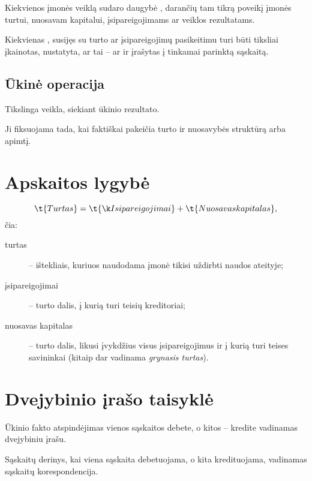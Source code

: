 
Kiekvienos įmonės veiklą sudaro daugybė , darančių
tam tikrą poveikį įmonės turtui, nuosavam kapitalui, įsipareigojimams
ar veiklos rezultatams.

Kiekvienas , susijęs su turto ar įsipareigojimų
pasikeitimu turi būti tiksliai įkainotas, nustatyta, ar tai
–  ar  ir įrašytas
į tinkamai parinktą sąskaitą.

\subsection{Ūkinė operacija}


Tikslinga veikla, siekiant ūkinio rezultato.

Ji fiksuojama tada, kai faktiškai pakeičia turto ir nuosavybės struktūrą
arba apimtį.

\section{Apskaitos lygybė}


\begin{equation*}
  \t{Turtas} = \t{Įsipareigojimai} + \t{Nuosavas kapitalas},
\end{equation*}
čia:
\begin{description}
  \item[turtas] – ištekliais, kuriuos naudodama įmonė tikisi uždirbti
    naudos ateityje;
  \item[įsipareigojimai] – turto dalis, į kurią turi teisių kreditoriai;
  \item[nuosavas kapitalas] – turto dalis, likusi įvykdžius visus
    įsipareigojimus ir į kurią turi teises savininkai (kitaip dar
    vadinama \emph{grynasis turtas}).
\end{description}

\section{Dvejybinio įrašo taisyklė}


Ūkinio fakto atspindėjimas vienos sąskaitos debete, o kitos – kredite
vadinamas dvejybiniu įrašu.

Sąskaitų derinys, kai viena sąskaita debetuojama, o kita kredituojama,
vadinamas sąskaitų korespondencija.

